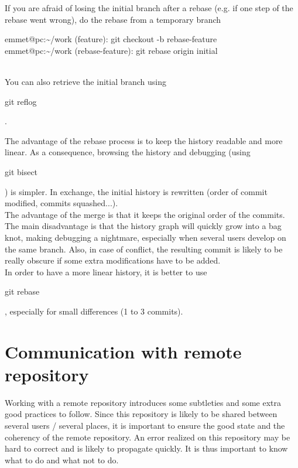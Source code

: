 If you are afraid of losing the initial branch after a rebase (e.g. if one step of the rebase went wrong), do the rebase from a temporary branch\\
\begin{tt}
emmet@pc:\textasciitilde/work (feature): git checkout -b rebase-feature\\
emmet@pc:\textasciitilde/work (rebase-feature): git rebase origin initial
\end{tt}\\
You can also retrieve the initial branch using \begin{tt}git reflog\end{tt}.

The advantage of the rebase process is to keep the history readable and more linear.
As a consequence, browsing the history and debugging (using \begin{tt}git bisect\end{tt}) is simpler.
In exchange, the initial history is rewritten (order of commit modified, commits squashed...).\\

The advantage of the merge is that it keeps the original order of the commits.
The main disadvantage is that the history graph will quickly grow into a bag knot, making debugging a nightmare, especially when several users develop on the same branch.
Also, in case of conflict, the resulting commit is likely to be really obscure if some extra modifications have to be added.\\


In order to have a more linear history, it is better to use \begin{tt}git rebase\end{tt}, especially for small differences (1 to 3 commits).\\

\section{Communication with remote repository}

Working with a remote repository introduces some subtleties and some extra good practices to follow.
Since this repository is likely to be shared between several users / several places, it is 
important to ensure the good state and the coherency of the remote repository.
An error realized on this repository may be hard to correct and is likely to propagate quickly.
It is thus important to know what to do and what not to do.\\

